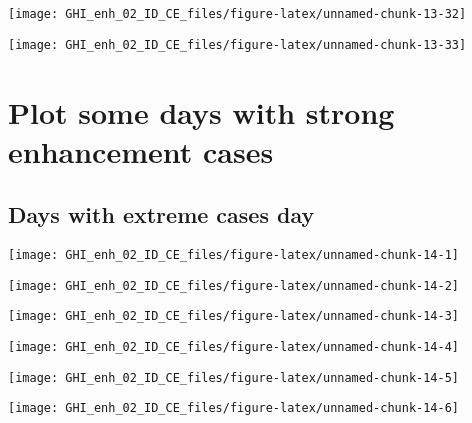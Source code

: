 \documentclass[
  10pt,
  a4paper,oneside]{article}
\begin{document}
\begin{center}\texttt{[image: GHI\_enh\_02\_ID\_CE\_files/figure-latex/unnamed-chunk-13-32]} \end{center}

\begin{center}\texttt{[image: GHI\_enh\_02\_ID\_CE\_files/figure-latex/unnamed-chunk-13-33]} \end{center}

\FloatBarrier

\hypertarget{plot-some-days-with-strong-enhancement-cases}{%
\section{Plot some days with strong enhancement cases}\label{plot-some-days-with-strong-enhancement-cases}}

\FloatBarrier

\hypertarget{days-with-extreme-cases-day}{%
\subsection{Days with extreme cases day}\label{days-with-extreme-cases-day}}

\begin{center}\texttt{[image: GHI\_enh\_02\_ID\_CE\_files/figure-latex/unnamed-chunk-14-1]} \end{center}

\begin{center}\texttt{[image: GHI\_enh\_02\_ID\_CE\_files/figure-latex/unnamed-chunk-14-2]} \end{center}

\begin{center}\texttt{[image: GHI\_enh\_02\_ID\_CE\_files/figure-latex/unnamed-chunk-14-3]} \end{center}

\begin{center}\texttt{[image: GHI\_enh\_02\_ID\_CE\_files/figure-latex/unnamed-chunk-14-4]} \end{center}

\begin{center}\texttt{[image: GHI\_enh\_02\_ID\_CE\_files/figure-latex/unnamed-chunk-14-5]} \end{center}

\begin{center}\texttt{[image: GHI\_enh\_02\_ID\_CE\_files/figure-latex/unnamed-chunk-14-6]} \end{center}
\end{document}

